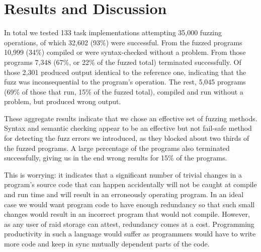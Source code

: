 \documentclass[10pt]{sigplanconf}
\begin{document}
\section{Results and Discussion} %
\label{sec:results}



In total we tested
133 task implementations
attempting 35,000 fuzzing operations,
of which 32,602 (93\%) were successful.
From the fuzzed programs 10,999 (34\%)
compiled or were syntax-checked without a problem.
From those programs 7,348 (67\%, or 22\% of the fuzzed total) terminated successfully.
Of those 2,301 produced output identical to the reference one,
indicating that the fuzz was
inconsequential to the program's operation.
The rest, 5,045 programs (69\% of those that run, 15\% of the fuzzed total),
compiled and run without a problem, but produced wrong output.

These aggregate results indicate that we chose an effective set
of fuzzing methods.
Syntax and semantic checking appear to be an effective but not
fail-safe method for detecting the fuzz errors we introduced,
as they blocked about two thirds of the fuzzed programs.
A large percentage of the programs also terminated successfully,
giving us in the end wrong results for 15\% of the programs.

This is worrying:
it indicates that a significant number of trivial changes in a program's source
code that can happen accidentally will not be caught at compile and run
time and will result in an erroneously operating program.
In an ideal case we would want program code to have enough redundancy
so that such small changes would result in an incorrect program
that would not compile.
However, as any user of {\sc raid} storage can attest,
redundancy comes at a cost.
Programming productivity in such a language would suffer as programmers
would have to write more code and keep in sync mutually dependent parts
of the code.
\end{document}
